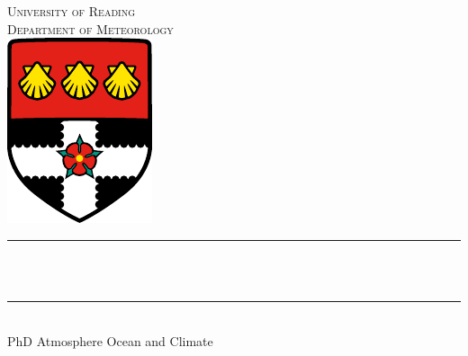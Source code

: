 \begin{titlingpage}
\makeatletter
\begin{center}
\textsc{\Large University of Reading} \\[8pt]
\textsc{{\Large Department of Meteorology}} \\[16pt]
\includegraphics{uor-logo} \\[48pt]

\rule{\textwidth}{.4pt} \\[12pt]
{ \huge \bfseries \@title \\[16pt] } \rule{\textwidth}{.4pt} \\[54pt]
{\LARGE \@author}
\vfill
{\Large PhD Atmosphere Ocean and Climate \\[8pt]}
{\Large \@date}
\end{center}
\makeatother
\end{titlingpage}
